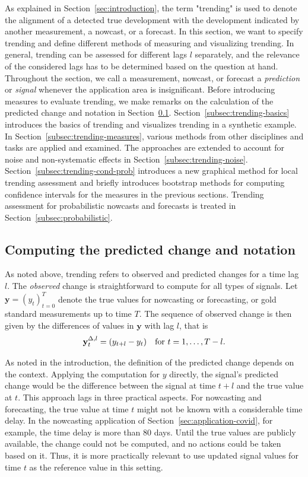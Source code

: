 
As explained in Section~\ref{sec:introduction}, the term "trending" is used to denote the alignment of a detected true development with the development indicated by another measurement, a nowcast, or a forecast.
In this section, we want to specify trending and define different methods of measuring and visualizing trending.
In general, trending can be assessed for different lags $l$ separately, and the relevance of the considered lags has to be determined based on the question at hand.
Throughout the section, we call a measurement, nowcast, or forecast a \textit{prediction} or \textit{signal} whenever the application area is insignificant.
Before introducing measures to evaluate trending, we make remarks on the calculation of the predicted change and notation in Section~\ref{subsec:notation}.
Section~\ref{subsec:trending-basics} introduces the basics of trending and visualizes trending in a synthetic example.
In Section~\ref{subsec:trending-measures}, various methods from other disciplines and tasks are applied and examined.
The approaches are extended to account for noise and non-systematic effects in Section~\ref{subsec:trending-noise}.
Section~\ref{subsec:trending-cond-prob} introduces a new graphical method for local trending assessment and briefly introduces bootstrap methods for computing confidence intervals for the measures in the previous sections.
Trending assessment for probabilistic nowcasts and forecasts is treated in Section~\ref{subsec:probabilistic}.

\subsection{Computing the predicted change and notation}\label{subsec:notation}

As noted above, trending refers to observed and predicted changes for a time lag $l$.
The \textit{observed} change is straightforward to compute for all types of signals.
Let $\mathbf{y} = (y_t)_{t=0}^T$ denote the true values for nowcasting or forecasting, or gold standard measurements up to time $T$.
The sequence of observed change is then given by the differences of values in $\mathbf{y}$ with lag $l$, that is
\begin{equation}\label{eq:diffy}
    \mathbf{y}^{\Delta,l}_t = (y_{t+l} - y_t) \quad \text{for}\ t = 1, \dots, T - l.
\end{equation}


As noted in the introduction, the definition of the predicted change depends on the context.
Applying the computation for $y$ directly, the signal's predicted change would be the difference between the signal at time $t + l$ and the true value at $t$.
This approach lags in three practical aspects.
For nowcasting and forecasting, the true value at time $t$ might not be known with a considerable time delay.
In the nowcasting application of Section~\ref{sec:application-covid}, for example, the time delay is more than 80 days.
Until the true values are publicly available, the change could not be computed, and no actions could be taken based on it.
Thus, it is more practically relevant to use updated signal values for time $t$ as the reference value in this setting.

